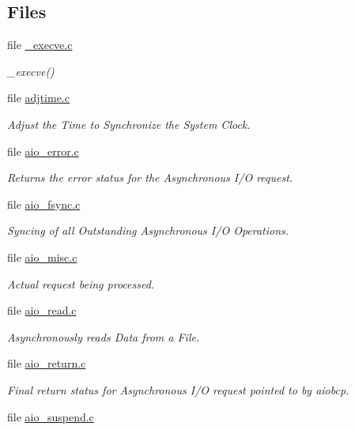 \subsection*{Files}
\begin{DoxyCompactItemize}
\item 
file \mbox{\hyperlink{__execve_8c}{\+\_\+execve.\+c}}
\begin{DoxyCompactList}\small\item\em \+\_\+execve() \end{DoxyCompactList}\item 
file \mbox{\hyperlink{adjtime_8c}{adjtime.\+c}}
\begin{DoxyCompactList}\small\item\em Adjust the Time to Synchronize the System Clock. \end{DoxyCompactList}\item 
file \mbox{\hyperlink{aio__error_8c}{aio\+\_\+error.\+c}}
\begin{DoxyCompactList}\small\item\em Returns the error status for the Asynchronous I/O request. \end{DoxyCompactList}\item 
file \mbox{\hyperlink{aio__fsync_8c}{aio\+\_\+fsync.\+c}}
\begin{DoxyCompactList}\small\item\em Syncing of all Outstanding Asynchronous I/O Operations. \end{DoxyCompactList}\item 
file \mbox{\hyperlink{aio__misc_8c}{aio\+\_\+misc.\+c}}
\begin{DoxyCompactList}\small\item\em Actual request being processed. \end{DoxyCompactList}\item 
file \mbox{\hyperlink{aio__read_8c}{aio\+\_\+read.\+c}}
\begin{DoxyCompactList}\small\item\em Asynchronously reads Data from a File. \end{DoxyCompactList}\item 
file \mbox{\hyperlink{aio__return_8c}{aio\+\_\+return.\+c}}
\begin{DoxyCompactList}\small\item\em Final return status for Asynchronous I/O request pointed to by aiobcp. \end{DoxyCompactList}\item 
file \mbox{\hyperlink{aio__suspend_8c}{aio\+\_\+suspend.\+c}}

\end{DoxyCompactItemize}
